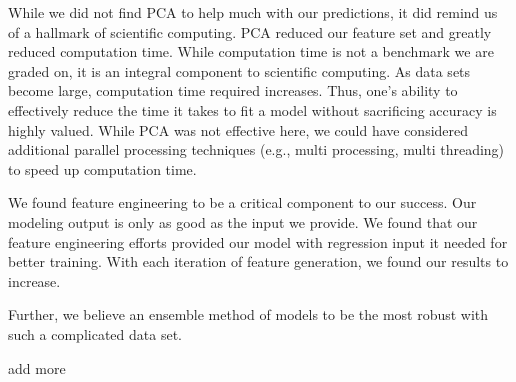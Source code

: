 \documentclass[11pt, oneside]{article}   	%
\begin{document}
While we did not find PCA to help much with our predictions, it did remind us of a hallmark of scientific computing. PCA reduced our feature set and greatly reduced computation time. While computation time is not a benchmark we are graded on, it is an integral component to scientific computing. As data sets become large, computation time required increases. Thus, one's ability to effectively reduce the time it takes to fit a model without sacrificing accuracy is highly valued. While PCA was not effective here, we could have considered additional parallel processing techniques (e.g., multi processing, multi threading) to speed up computation time. 

We found feature engineering to be a critical component to our success. Our modeling output is only as good as the input we provide. We found that our feature engineering efforts provided our model with regression input it needed for better training. With each iteration of feature generation, we found our results to increase. 

Further, we believe an ensemble method of models to be the most robust with such a complicated data set. 

add more


\end{document}
